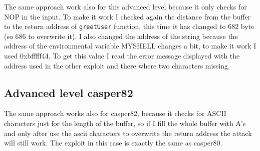 \documentclass[a4paper,12pt]{article}
\begin{document}
The same approach work also for this advanced level because it only checks for NOP in the input. To make it work I checked again the distance from the buffer to the return address of \texttt{greetUser} function, this time it has changed to 682 byte (so 686 to overwrite it). I also changed the address of the string because the address of the environmental variable MYSHELL changes a bit, to make it work I used 0xbfffff44. To get this value I read the error message displayed with the address used in the other exploit and there where two characters missing.

\subsection{Advanced level casper82}

The same approach works also for casper82, because it checks for ASCII characters just for the length of the buffer, so if I fill the whole buffer with A's and only after use the ascii characters to overwrite the return address the attack will still work. The exploit in this case is exactly the same as casper80.
\end{document}
